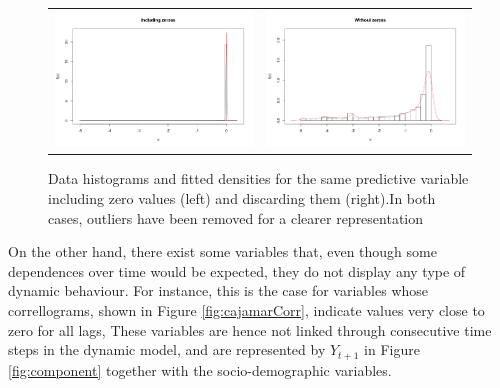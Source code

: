 \begin{figure}[h]
  \centering
    \begin{tabular}{cc}    
       \includegraphics[width=70mm]{figures/with_zeroes}&
       \includegraphics[width=70mm]{figures/without_zeroes}
    \end{tabular}
    \caption{\label{fig:CajamarZeroes}Data histograms and fitted densities for the same predictive variable including zero values (left) and discarding them (right).In both cases, outliers have been removed for a clearer representation}

\end{figure}

On the other hand, there exist some variables that, even though some dependences over time would be expected, they do not display any type of dynamic behaviour. For instance, this is the case for variables whose correllograms, shown in Figure \ref{fig:cajamarCorr}, indicate values very close to zero for all lags, These variables are hence not linked through consecutive time steps in the dynamic model, and are represented by $Y_{t+1}$ in Figure \ref{fig:component} together with the socio-demographic variables.

